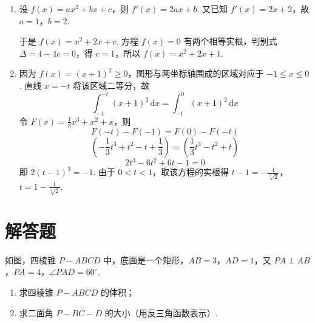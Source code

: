 \documentclass[UTF8,a4paper,oneside,11pt]{ctexbook}
\begin{document}
\begin{solution}
\begin{enumerate}
\item 设 \(f(x)=ax^2+bx+c\)，则 \(f'(x)=2ax+b\). 又已知 \(f'(x)=2x+2\)，故 \(a=1\)，\(b=2\).

于是 \(f(x)=x^2+2x+c\). 方程 \(f(x)=0\) 有两个相等实根，判别式 \(\Delta=4-4c=0\)，得 \(c=1\)，所以 \(f(x)=x^2+2x+1\).

\item 因为 \(f(x)=(x+1)^2\geqslant0\)，图形与两坐标轴围成的区域对应于 \(-1\leqslant x\leqslant0\). 直线 \(x=-t\) 将该区域二等分，故
\[
\int_{-1}^{-t}(x+1)^2\,\mathrm{d}x=\int_{-t}^{0}(x+1)^2\,\mathrm{d}x
\]
令 \(F(x)=\frac13x^3+x^2+x\)，则
\[
F(-t)-F(-1)=F(0)-F(-t)
\]
\[
\left(-\frac13t^3+t^2-t+\frac13\right)=\left(\frac13t^3-t^2+t\right)
\]
\[
2t^3-6t^2+6t-1=0
\]
即 \(2(t-1)^3=-1\). 由于 \(0<t<1\)，取该方程的实根得
\(t-1=-\frac1{\sqrt[3]{2}}\)，\(t=1-\frac1{\sqrt[3]{2}}\).
\end{enumerate}
\end{solution}

\section{解答题}

\begin{problem}
如图，四棱锥 \(P-ABCD\) 中，底面是一个矩形，\(AB=3\)，\(AD=1\)，又 \(PA\perp AB\)，\(PA=4\)，\(\angle PAD=60^\circ\).

\begin{enumerate}
\item 求四棱锥 \(P-ABCD\) 的体积；
\item 求二面角 \(P-BC-D\) 的大小（用反三角函数表示）.
\end{enumerate}

\end{problem}
\end{document}
